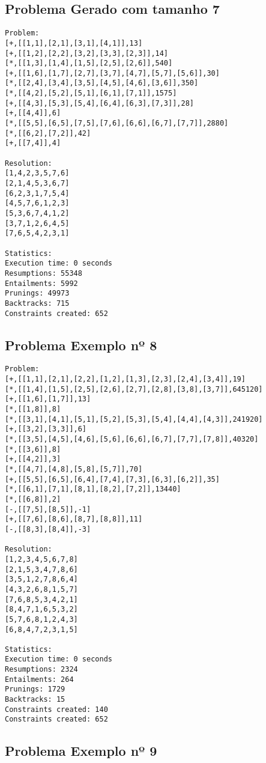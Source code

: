 \documentclass[runningheads,a4paper]{llncs}
\begin{document}
\subsection{Problema Gerado com tamanho 7}

\begin{lstlisting}
Problem:
[+,[[1,1],[2,1],[3,1],[4,1]],13]
[+,[[1,2],[2,2],[3,2],[3,3],[2,3]],14]
[*,[[1,3],[1,4],[1,5],[2,5],[2,6]],540]
[+,[[1,6],[1,7],[2,7],[3,7],[4,7],[5,7],[5,6]],30]
[*,[[2,4],[3,4],[3,5],[4,5],[4,6],[3,6]],350]
[*,[[4,2],[5,2],[5,1],[6,1],[7,1]],1575]
[+,[[4,3],[5,3],[5,4],[6,4],[6,3],[7,3]],28]
[+,[[4,4]],6]
[*,[[5,5],[6,5],[7,5],[7,6],[6,6],[6,7],[7,7]],2880]
[*,[[6,2],[7,2]],42]
[+,[[7,4]],4]

Resolution:
[1,4,2,3,5,7,6]
[2,1,4,5,3,6,7]
[6,2,3,1,7,5,4]
[4,5,7,6,1,2,3]
[5,3,6,7,4,1,2]
[3,7,1,2,6,4,5]
[7,6,5,4,2,3,1]

Statistics:
Execution time: 0 seconds
Resumptions: 55348
Entailments: 5992
Prunings: 49973
Backtracks: 715
Constraints created: 652
\end{lstlisting}

\subsection{Problema Exemplo nº 8}

\begin{lstlisting}
Problem:
[+,[[1,1],[2,1],[2,2],[1,2],[1,3],[2,3],[2,4],[3,4]],19]
[*,[[1,4],[1,5],[2,5],[2,6],[2,7],[2,8],[3,8],[3,7]],645120]
[+,[[1,6],[1,7]],13]
[*,[[1,8]],8]
[*,[[3,1],[4,1],[5,1],[5,2],[5,3],[5,4],[4,4],[4,3]],241920]
[+,[[3,2],[3,3]],6]
[*,[[3,5],[4,5],[4,6],[5,6],[6,6],[6,7],[7,7],[7,8]],40320]
[*,[[3,6]],8]
[+,[[4,2]],3]
[*,[[4,7],[4,8],[5,8],[5,7]],70]
[+,[[5,5],[6,5],[6,4],[7,4],[7,3],[6,3],[6,2]],35]
[*,[[6,1],[7,1],[8,1],[8,2],[7,2]],13440]
[*,[[6,8]],2]
[-,[[7,5],[8,5]],-1]
[+,[[7,6],[8,6],[8,7],[8,8]],11]
[-,[[8,3],[8,4]],-3]

Resolution:
[1,2,3,4,5,6,7,8]
[2,1,5,3,4,7,8,6]
[3,5,1,2,7,8,6,4]
[4,3,2,6,8,1,5,7]
[7,6,8,5,3,4,2,1]
[8,4,7,1,6,5,3,2]
[5,7,6,8,1,2,4,3]
[6,8,4,7,2,3,1,5]

Statistics:
Execution time: 0 seconds
Resumptions: 2324
Entailments: 264
Prunings: 1729
Backtracks: 15
Constraints created: 140
Constraints created: 652
\end{lstlisting}

\subsection{Problema Exemplo nº 9}
\end{document}
